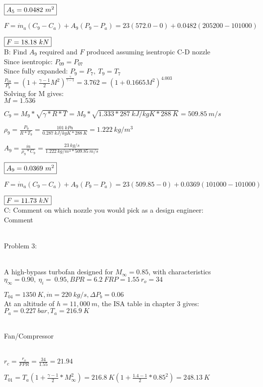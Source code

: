 \documentclass{article}
\begin{document}
$\fbox{$A_5=0.0482\ m^2$}$

$F=\dot{m}_a(C_9-C_a)+A_9(P_9-P_a)=23(572.0-0)+0.0482(205200-101000)$

$\fbox{$F=18.18\ kN$}$
\\

 B: Find $A_9$ required and $F$ produced assuming isentropic C-D nozzle
\\

Since isentropic: $P_{09}=P_{07}$
\\

Since fully expanded: $P_9=P_7,\ T_9=T_7$
\\

$\frac{P_09}{P_9}=(1+\frac{\gamma-1}{2}M^2)^{\frac{\gamma}{\gamma-1}}=3.762=(1+0.1665M^2)^{4.003}$
\\

Solving for M gives:
\\

$M=1.536$

$C_9=M_9*\sqrt{\gamma*R*T}=M_9*\sqrt{1.333*287\ kJ/kgK*288\ K}=509.85\ m/s$

$\rho_9=\frac{P_9}{R*T_9}=\frac{101\ kPa}{0.287\ kJ/kgK*288\ K}=1.222\ kg/m^3$

$A_9=\frac{\dot{m}}{\rho_9*C_9}=\frac{23\ kg/s}{1.222\ kg/m^3*509.85\ m/s}$

$\fbox{$A_9=0.0369\ m^2$}$

$F=\dot{m}_a(C_9-C_a)+A_9(P_9-P_a)=23(509.85-0)+0.0369(101000-101000)$

$\fbox{$F=11.73\ kN$}$
\\

C: Comment on which nozzle you would pick as a design engineer:
\\

Comment
\\
\\

\begin{LARGE}
	Problem 3:
\end{LARGE}
\\

A high-bypass turbofan designed for $M_{\infty}=0.85$, with characteristics
\\

$\eta_{\infty}=0.90,\ \eta_{i}=\ 0.95, BPR=6.2\ FRP=1.55\ r_o=34$

$T_{04}=1350\ K, \dot{m}=220\ kg/s, \Delta P_b=0.06$
\\

At an altitude of $h=11,000\ m$, the ISA table in chapter 3 gives: 
\\

$P_a=0.227\ bar, T_a=216.9\ K$
\\
\\

	\begin{Large}
		Fan/Compressor
	\end{Large}
\\

$r_c=\frac{r_o}{FPR}=\frac{34}{1.55}=21.94$

$T_{01}=T_a(1+\frac{\gamma-1}{2}*M_{\infty}^{2})=216.8\ K(1+\frac{1.4-1}{2}*0.85^2)=248.13\ K$
\end{document}
